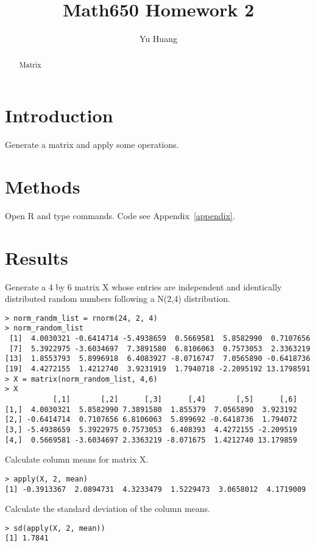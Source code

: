 \documentclass[a4paper,10pt]{article}
\title{Math650 Homework 2}
\author{Yu Huang}
\begin{document}
\maketitle

\begin{abstract}
Matrix
\end{abstract}

\section{Introduction}
Generate a matrix and apply some operations.

\section{Methods}
Open R and type commands. Code see Appendix~\ref{appendix}.

\section{Results}


Generate a 4 by 6 matrix X whose entries are independent and identically distributed random numbers following a N(2,4) distribution.
\begin{verbatim}
> norm_randm_list = rnorm(24, 2, 4)
> norm_random_list
 [1]  4.0030321 -0.6414714 -5.4938659  0.5669581  5.8582990  0.7107656
 [7]  5.3922975 -3.6034697  7.3891580  6.8106063  0.7573053  2.3363219
[13]  1.8553793  5.8996918  6.4083927 -8.0716747  7.0565890 -0.6418736
[19]  4.4272155  1.4212740  3.9231919  1.7940718 -2.2095192 13.1798591
> X = matrix(norm_random_list, 4,6)
> X
           [,1]       [,2]      [,3]      [,4]       [,5]      [,6]
[1,]  4.0030321  5.8582990 7.3891580  1.855379  7.0565890  3.923192
[2,] -0.6414714  0.7107656 6.8106063  5.899692 -0.6418736  1.794072
[3,] -5.4938659  5.3922975 0.7573053  6.408393  4.4272155 -2.209519
[4,]  0.5669581 -3.6034697 2.3363219 -8.071675  1.4212740 13.179859
\end{verbatim}

Calculate column means for matrix X.
\begin{verbatim}
> apply(X, 2, mean)
[1] -0.3913367  2.0894731  4.3233479  1.5229473  3.0658012  4.1719009
\end{verbatim}

Calculate the standard deviation of the column means.
\begin{verbatim}
> sd(apply(X, 2, mean))
[1] 1.7841
\end{verbatim}
\end{document}
